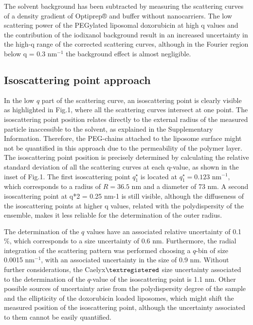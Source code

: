 The solvent background has been subtracted by measuring the scattering curves of a density gradient of Optiprep® and buffer without nanocarriers. The low scattering power of the PEGylated liposomal doxorubicin at high q values and the contribution of the iodixanol background  result in an increased uncertainty in the high-q range of the corrected scattering curves, although in the Fourier region below q = 0.3 nm$^{-1}$ the background effect is almost negligible.

\subsection{Isoscattering point approach}
In the low $q$ part of the scattering curve, an isoscattering point is clearly visible as highlighted in Fig.1, where all the scattering curves intersect at one point. The isoscattering point position relates directly to the external radius of the measured particle inaccessible to the solvent, as explained in the Supplementary Information. Therefore, the PEG-chains attached to the liposome surface might not be quantified in this approach due to the permeability of the polymer layer. The isoscattering point position is precisely determined by calculating the relative standard deviation of all the scattering curves at each q-value, as shown in the inset of Fig.1. The first isoscattering point $q^{\star}_1$ is located at $q^{\star}_1 = 0.123$ nm$^{-1}$, which corresponds to a radius of $R = 36.5$ nm and a diameter of 73 nm. A second isoscattering point at q*2 = 0.25 nm-1 is still visible, although the diffuseness of the isoscattering points at higher q values, related with the polydispersity of the ensemble, makes it less reliable for the determination of the outer radius.

The determination of the $q$ values have an associated relative uncertainty of 0.1 $\%$, which corresponds to a size uncertainty of 0.6 nm. Furthermore, the radial integration of the scattering pattern was performed choosing a $q$-bin of size 0.0015 nm$^{-1}$, with an associated uncertainty in the size of 0.9 nm. Without further considerations, the Caelyx$\textregistered$ size uncertainty associated to the determination of the $q$-value of the isoscattering point is 1.1 nm. Other possible sources of uncertainty arise from the polydispersity degree of the sample and the ellipticity of the doxorubicin loaded liposomes, which might shift the measured position of the isoscattering point, although the uncertainty associated to them cannot be easily quantified. 

